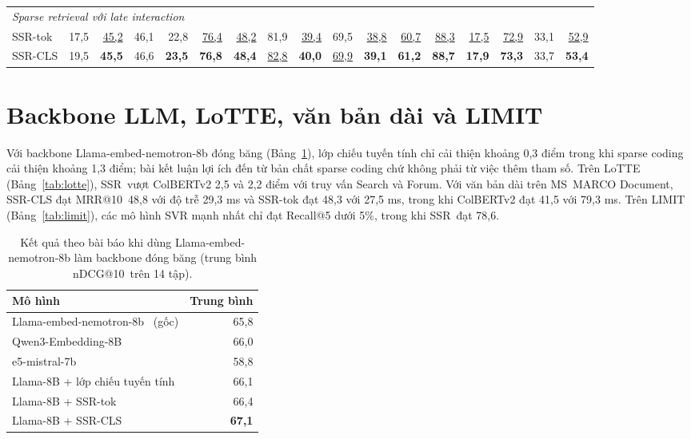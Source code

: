 \documentclass[a4paper,13pt]{extreport}
\makeatletter
\theoremstyle{plain}
\newcommand{\ssr}{SSR}
\newcommand{\ndcg}{nDCG@10}
\newcommand{\mrr}{MRR@10}
\makeatother
\begin{document}
\begin{landscape}
\begin{table}[p]
\begin{tabular}{lrrrrrrrrrrrrrrrr}
\multicolumn{17}{l}{\textit{Sparse retrieval với late interaction}}\\
\ssr-tok & 17,5 & \underline{45,2} & 46,1 & 22,8 & \underline{76,4} & \underline{48,2} & 81,9 & \underline{39,4} & 69,5 & \underline{38,8} & \underline{60,7} & \underline{88,3} & \underline{17,5} & \underline{72,9} & 33,1 & \underline{52,9}\\
\ssr-CLS & 19,5 & \textbf{45,5} & 46,6 & \textbf{23,5} & \textbf{76,8} & \textbf{48,4} & \underline{82,8} & \textbf{40,0} & \underline{69,9} & \textbf{39,1} & \textbf{61,2} & \textbf{88,7} & \textbf{17,9} & \textbf{73,3} & 33,7 & \textbf{53,4}\\
\bottomrule
\end{tabular}
\end{table}
\end{landscape}

\section{Backbone LLM, LoTTE, văn bản dài và LIMIT}
Với backbone Llama-embed-nemotron-8b đóng băng (Bảng~\ref{tab:llm-paper}), lớp chiếu tuyến tính chỉ cải thiện khoảng 0,3 điểm trong khi sparse coding cải thiện khoảng 1,3 điểm; bài kết luận lợi ích đến từ bản chất sparse coding chứ không phải từ việc thêm tham số. Trên LoTTE (Bảng~\ref{tab:lotte}), \ssr\ vượt ColBERTv2 2,5 và 2,2 điểm với truy vấn Search và Forum. Với văn bản dài trên MS~MARCO Document, \ssr-CLS đạt \mrr\ 48,8 với độ trễ 29,3 ms và \ssr-tok đạt 48,3 với 27,5 ms, trong khi ColBERTv2 đạt 41,5 với 79,3 ms. Trên LIMIT (Bảng~\ref{tab:limit}), các mô hình SVR mạnh nhất chỉ đạt Recall@5 dưới 5\%, trong khi \ssr\ đạt 78,6.

\begin{table}[htbp]
\centering
\caption{Kết quả theo bài báo khi dùng Llama-embed-nemotron-8b làm backbone đóng băng (trung bình \ndcg\ trên 14 tập).}
\label{tab:llm-paper}
\small
\begin{tabular}{lr}
\toprule
\textbf{Mô hình} & \textbf{Trung bình}\\
\midrule
Llama-embed-nemotron-8b~\cite{babakhin2025} (gốc) & 65,8\\
Qwen3-Embedding-8B~\cite{zhang2025b} & 66,0\\
e5-mistral-7b~\cite{wang2023} & 58,8\\
Llama-8B + lớp chiếu tuyến tính & 66,1\\
Llama-8B + \ssr-tok & 66,4\\
Llama-8B + \ssr-CLS & \textbf{67,1}\\
\bottomrule
\end{tabular}
\end{table}
\end{document}
